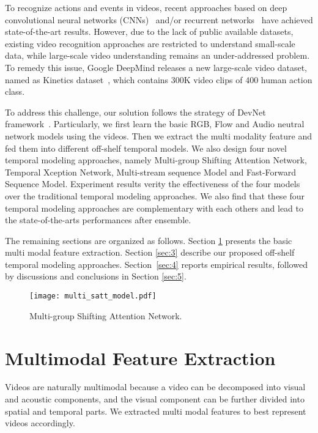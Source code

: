 \documentclass[10pt,twocolumn,letterpaper]{article}
\begin{document}
To recognize actions and events in videos, recent approaches based on deep convolutional neural networks (CNNs)~\cite{Sports1M,Twostream,devnet,C3D,gan2016you} and/or recurrent networks~\cite{LSTM,ULSTM,cho2014properties} have achieved state-of-the-art results. However, due to the lack of public available datasets, existing video recognition approaches are restricted to understand small-scale data, while large-scale video understanding remains an under-addressed problem.  To remedy this issue, Google DeepMind releases a new large-scale video dataset, named as Kinetics dataset~\cite{kay2017kinetics}, which contains 300K video clips of 400 human action class.

To address this challenge, our solution follows the strategy of DevNet framework~\cite{devnet}. Particularly, we first learn the basic RGB, Flow and Audio neutral network models using the videos. Then we extract the multi modality feature and fed them into different off-shelf temporal models. We also design four novel temporal modeling approaches, namely Multi-group Shifting Attention Network, Temporal Xception Network, Multi-stream sequence Model and Fast-Forward Sequence Model. Experiment results verity the effectiveness of the four models over the traditional temporal modeling approaches. We also find that these four temporal modeling approaches are complementary with each others and lead to the state-of-the-arts performances after ensemble.

The remaining sections are organized as follows. Section \ref{sec:2} presents the basic multi modal feature extraction. Section \ref{sec:3} describe our proposed off-shelf temporal modeling approaches. Section~\ref{sec:4} reports empirical results, followed by discussions and conclusions in Section \ref{sec:5}.

\begin{figure*}[t!]
    \centering
    \texttt{[image: multi\_satt\_model.pdf]}\\
    \caption{Multi-group Shifting Attention Network.}
    \label{fig:satt}
\end{figure*}

\section{Multimodal Feature Extraction}

\label{sec:2}

Videos are naturally multimodal because a video can be decomposed into visual and acoustic components, and the visual component can be further divided into spatial and temporal parts. We extracted multi modal features to best represent videos accordingly.
\end{document}
